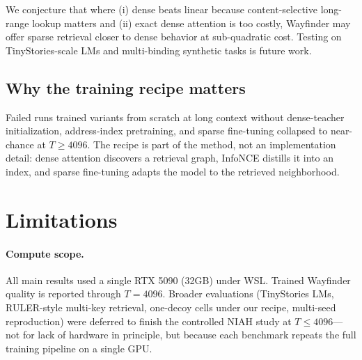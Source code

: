 \documentclass{article}
\begin{document}
We conjecture that where (i) dense beats linear because content-selective long-range lookup matters and (ii) exact dense attention is too costly, Wayfinder may offer sparse retrieval closer to dense behavior at sub-quadratic cost. Testing on TinyStories-scale LMs and multi-binding synthetic tasks is future work.

\subsection{Why the training recipe matters}

Failed runs trained variants from scratch at long context without dense-teacher initialization, address-index pretraining, and sparse fine-tuning collapsed to near-chance at $T \ge 4096$. The recipe is part of the method, not an implementation detail: dense attention discovers a retrieval graph, InfoNCE distills it into an index, and sparse fine-tuning adapts the model to the retrieved neighborhood.

\section{Limitations}

\paragraph{Compute scope.}
All main results used a single RTX 5090 (32GB) under WSL. Trained Wayfinder quality is reported through $T=4096$. Broader evaluations (TinyStories LMs, RULER-style multi-key retrieval, one-decoy cells under our recipe, multi-seed reproduction) were deferred to finish the controlled NIAH study at $T \le 4096$---not for lack of hardware in principle, but because each benchmark repeats the full training pipeline on a single GPU.
\end{document}
